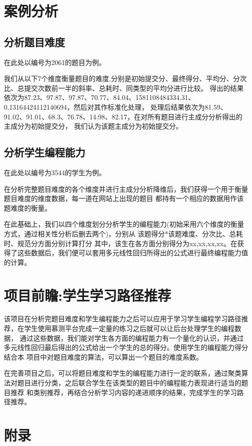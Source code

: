 \documentclass[UTF8]{ctexart}
\begin{document}
\section{案例分析}
\subsection{分析题目难度}
在此处以编号为2061的题目为例。

我们从以下7个维度衡量题目的难度,分别是初始提交分、最终得分、平均分、分次比、总提交次数前一半的斜率、总耗时、同类型的平均分进行比较。
得出的结果依次为87.23、97.87、97.87、70.77、84.04、1581108484334.31、0.13164424112140694，然后对其作标准化处理，
处理后结果依次为81.59、91.02、91.01、68.3、76.78、14.98、82.17，在对所有题目进行主成分分析得出的主成分为初始提交分，
我们认为该题主成分为初始提交分。
\subsection{分析学生编程能力}
在此处以编号为3544的学生为例。

在分析完整题目难度的各个维度并进行主成分分析降维后，我们获得一个用于衡量题目难度的维度数据，每一道在网站上出现的题目
都持有一个相应的数据用作该题难度的衡量。

在此基础上，我们以四个维度划分分析学生的编程能力(初始采用六个维度的衡量方式，通过相关性分析后删去两个)，分别从 该题得分*该题难度、分次比、总耗时、规范分方面分别计算打分
其中，该生在各方面分别得分为xx,xx,xx,xx。在获得了这些数据后，我们便可以套用多元线性回归所得出的公式进行最终编程能力值的计算。
\section{项目前瞻:学生学习路径推荐}
该项目在分析完题目难度和学生编程能力之后可以应用于学习学生编程学习路径推荐，在学生使用慕测平台完成一定量的练习之后就可以让后台处理学生的编程数据，
通过这些数据，我们能对学生各方面的编程能力有一个量化的认识，并通过多元线性回归最后得出的公式给出一个学生的总的得分。使用学生的编程能力得分结合本
项目中对题目难度的算法，可以算出一个题目的难度系数。

在完善项目之后，可以将题目难度和学生的编程能力进行一定的联系，通过聚类算法对题目进行分类，之后联合学生在该类型的题目中的编程能力表现进行适当的题目推荐
和类别推荐，再结合分析学习内容的递进顺序的结果，完成学生的学习路径推荐。

\section{附录}
\end{document}
